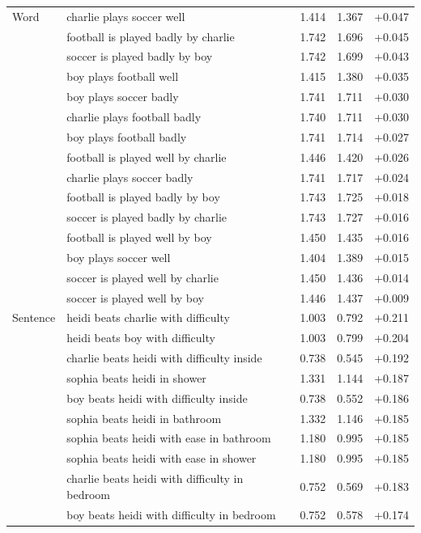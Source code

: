 \begin{longtable}{@{}llrrr@{}}
\bottomrule
\endlastfoot
Word & charlie plays soccer well & 1.414 & 1.367 & +0.047 \\
 & football is played badly by charlie & 1.742 & 1.696 & +0.045 \\
 & soccer is played badly by boy & 1.742 & 1.699 & +0.043 \\
 & boy plays football well & 1.415 & 1.380 & +0.035 \\
 & boy plays soccer badly & 1.741 & 1.711 & +0.030 \\
 & charlie plays football badly & 1.740 & 1.711 & +0.030 \\
 & boy plays football badly & 1.741 & 1.714 & +0.027 \\
 & football is played well by charlie & 1.446 & 1.420 & +0.026 \\
 & charlie plays soccer badly & 1.741 & 1.717 & +0.024 \\
 & football is played badly by boy & 1.743 & 1.725 & +0.018 \\
 & soccer is played badly by charlie & 1.743 & 1.727 & +0.016 \\
 & football is played well by boy & 1.450 & 1.435 & +0.016 \\
 & boy plays soccer well & 1.404 & 1.389 & +0.015 \\
 & soccer is played well by charlie & 1.450 & 1.436 & +0.014 \\
 & soccer is played well by boy & 1.446 & 1.437 & +0.009 \\
\addlinespace
Sentence & heidi beats charlie with difficulty & 1.003 & 0.792 & +0.211 \\
 & heidi beats boy with difficulty & 1.003 & 0.799 & +0.204 \\
 & charlie beats heidi with difficulty inside & 0.738 & 0.545 & +0.192 \\
 & sophia beats heidi in shower & 1.331 & 1.144 & +0.187 \\
 & boy beats heidi with difficulty inside & 0.738 & 0.552 & +0.186 \\
 & sophia beats heidi in bathroom & 1.332 & 1.146 & +0.185 \\
 & sophia beats heidi with ease in bathroom & 1.180 & 0.995 & +0.185 \\
 & sophia beats heidi with ease in shower & 1.180 & 0.995 & +0.185 \\
 & charlie beats heidi with difficulty in bedroom & 0.752 & 0.569 & +0.183 \\
 & boy beats heidi with difficulty in bedroom & 0.752 & 0.578 & +0.174 \\

\end{longtable}
